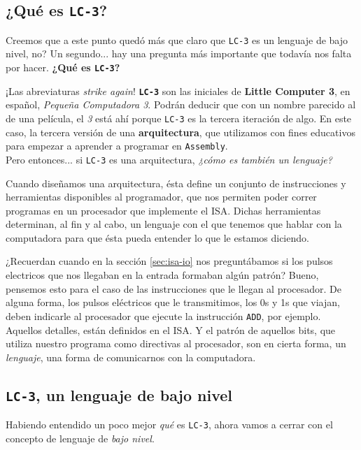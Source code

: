\documentclass[a4paper, titlepage]{report}
\begin{document}
	
	\subsection{¿Qué es \texttt{LC-3}?}
	
	Creemos que a este punto quedó más que claro que \texttt{LC-3} es un lenguaje de bajo nivel, no? Un segundo... hay una pregunta más importante que todavía nos falta por hacer. \textbf{¿Qué es \texttt{LC-3}?}
	
	¡Las abreviaturas \textit{strike again}! \texttt{\textbf{LC-3}} son las iniciales de \textbf{Little Computer 3}, en español, \textit{Pequeña Computadora 3}. Podrán deducir que con un nombre parecido al de una película, el \textit{3} está ahí porque \texttt{LC-3} es la tercera iteración de algo. En este caso, la tercera versión de una \textbf{arquitectura}, que utilizamos con fines educativos para empezar a aprender a programar en \texttt{Assembly}.\\
	
	Pero entonces... si \texttt{LC-3} es una arquitectura, \textit{¿cómo es también un lenguaje?}
	
	Cuando diseñamos una arquitectura, ésta define un conjunto de instrucciones y herramientas disponibles al programador, que nos permiten poder correr programas en un procesador que implemente el ISA. Dichas herramientas determinan, al fin y al cabo, un lenguaje con el que tenemos que hablar con la computadora para que ésta pueda entender lo que le estamos diciendo.
	
	¿Recuerdan cuando en la sección \ref{sec:isa-io} nos preguntábamos si los pulsos electricos que nos llegaban en la entrada formaban algún patrón? Bueno, pensemos esto para el caso de las instrucciones que le llegan al procesador. De alguna forma, los pulsos eléctricos que le transmitimos, los 0s y 1s que viajan, deben indicarle al procesador que ejecute la instrucción \texttt{ADD}, por ejemplo. Aquellos detalles, están definidos en el ISA. Y el patrón de aquellos bits, que utiliza nuestro programa como directivas al procesador, son en cierta forma, un \textit{lenguaje}, una forma de comunicarnos con la computadora.\\
	
	\subsection{\texttt{LC-3}, un lenguaje de bajo nivel}
	
	Habiendo entendido un poco mejor \textit{qué} es \texttt{LC-3}, ahora vamos a cerrar con el concepto de lenguaje de \textit{bajo nivel}.
	
\end{document}
